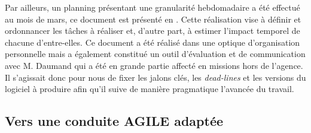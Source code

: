   Par ailleurs, un planning présentant une granularité hebdomadaire a été effectué au mois de mars, ce document est présenté en .
  Cette réalisation vise à définir et ordonnancer les tâches à réaliser et, d'autre part, à estimer l'impact temporel de chacune d'entre-elles. 
  Ce document a été réalisé dans une optique d'organisation personnelle mais a également constitué un outil d'évaluation et de communication avec M. Daumand qui a été en grande partie affecté en missions hors de l'agence. 
  Il s'agissait donc pour nous de fixer les jalons clés, les \emph{dead-lines} et les versions du logiciel à produire afin qu'il suive de manière pragmatique l'avancée du travail. 
  
  \subsection{Vers une conduite AGILE adaptée}
  
